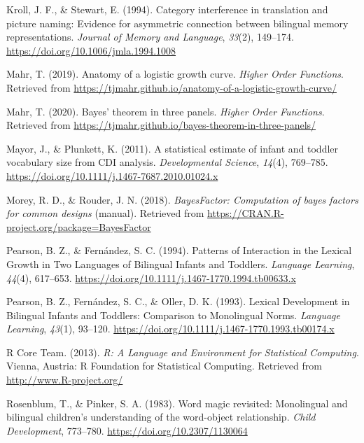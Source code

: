 \documentclass[
  english,
  man,man,floatsintext]{apa6}
\begin{document}
\leavevmode\hypertarget{ref-kroll1994}{}%
Kroll, J. F., \& Stewart, E. (1994). Category interference in translation and picture naming: Evidence for asymmetric connection between bilingual memory representations. \emph{Journal of Memory and Language}, \emph{33}(2), 149--174. \url{https://doi.org/10.1006/jmla.1994.1008}

\leavevmode\hypertarget{ref-mahr2019}{}%
Mahr, T. (2019). Anatomy of a logistic growth curve. \emph{Higher Order Functions}. Retrieved from \url{https://tjmahr.github.io/anatomy-of-a-logistic-growth-curve/}

\leavevmode\hypertarget{ref-mahr2020}{}%
Mahr, T. (2020). Bayes' theorem in three panels. \emph{Higher Order Functions}. Retrieved from \url{https://tjmahr.github.io/bayes-theorem-in-three-panels/}

\leavevmode\hypertarget{ref-mayor2011}{}%
Mayor, J., \& Plunkett, K. (2011). A statistical estimate of infant and toddler vocabulary size from CDI analysis. \emph{Developmental Science}, \emph{14}(4), 769--785. \url{https://doi.org/10.1111/j.1467-7687.2010.01024.x}

\leavevmode\hypertarget{ref-morey2018a}{}%
Morey, R. D., \& Rouder, J. N. (2018). \emph{BayesFactor: Computation of bayes factors for common designs} (manual). Retrieved from \url{https://CRAN.R-project.org/package=BayesFactor}

\leavevmode\hypertarget{ref-pearson1994}{}%
Pearson, B. Z., \& Fernández, S. C. (1994). Patterns of Interaction in the Lexical Growth in Two Languages of Bilingual Infants and Toddlers. \emph{Language Learning}, \emph{44}(4), 617--653. \url{https://doi.org/10.1111/j.1467-1770.1994.tb00633.x}

\leavevmode\hypertarget{ref-pearson1993}{}%
Pearson, B. Z., Fernández, S. C., \& Oller, D. K. (1993). Lexical Development in Bilingual Infants and Toddlers: Comparison to Monolingual Norms. \emph{Language Learning}, \emph{43}(1), 93--120. \url{https://doi.org/10.1111/j.1467-1770.1993.tb00174.x}

\leavevmode\hypertarget{ref-rcoreteam2013}{}%
R Core Team. (2013). \emph{R: A Language and Environment for Statistical Computing}. Vienna, Austria: R Foundation for Statistical Computing. Retrieved from \url{http://www.R-project.org/}

\leavevmode\hypertarget{ref-rosenblum1983word}{}%
Rosenblum, T., \& Pinker, S. A. (1983). Word magic revisited: Monolingual and bilingual children's understanding of the word-object relationship. \emph{Child Development}, 773--780. \url{https://doi.org/10.2307/1130064}
\end{document}
